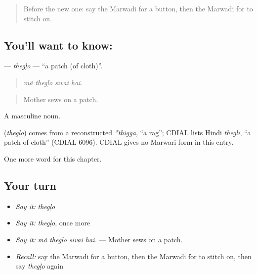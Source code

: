 \label{lesson:MW-C177-theglo}



\begin{quote}
Before the new one: say the Marwadi for a button, then the Marwadi for to stitch on.
\end{quote}

\subsection*{You'll want to know: }
\textbf{} — \emph{thegḷo} — \textquotedblleft{}a patch (of cloth)\textquotedblright{}.

\begin{quote}
   
\end{quote}

\begin{quote}
\emph{mā̃ thegḷo sīvai hai.}
\end{quote}

\begin{quote}
Mother sews on a patch.
\end{quote}

A masculine noun.

\begin{cousinweb}
\textbf{} (\emph{thegḷo}) comes from a reconstructed \emph{*thigga}, \textquotedblleft{}a rag\textquotedblright{}; CDIAL lists Hindi \emph{theglī}, \textquotedblleft{}a patch of cloth\textquotedblright{} (CDIAL 6096). CDIAL gives no Marwari form in this entry.
\end{cousinweb}

\begin{grammarlens}[title={What you've built}]
One more word for this chapter.
\end{grammarlens}

\subsection*{Your turn}
\begin{itemize}
\raggedright
  \item \emph{Say it:} \emph{thegḷo}
  \item \emph{Say it:} \emph{thegḷo}, once more
  \item \emph{Say it:} \emph{mā̃ thegḷo sīvai hai.} — Mother sews on a patch.
  \item \emph{Recall:} say the Marwadi for a button, then the Marwadi for to stitch on, then say \emph{thegḷo} again
\end{itemize}

